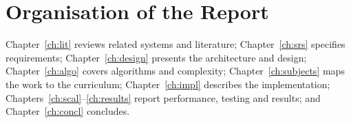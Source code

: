 \section{Organisation of the Report}
Chapter~\ref{ch:lit} reviews related systems and literature; Chapter~\ref{ch:srs} specifies requirements;
Chapter~\ref{ch:design} presents the architecture and design; Chapter~\ref{ch:algo} covers algorithms and
complexity; Chapter~\ref{ch:subjects} maps the work to the curriculum; Chapter~\ref{ch:impl} describes the
implementation; Chapters~\ref{ch:scal}--\ref{ch:results} report performance, testing and results; and
Chapter~\ref{ch:concl} concludes.
